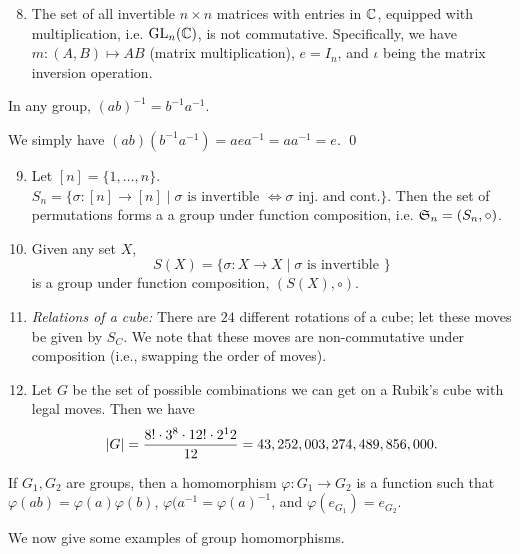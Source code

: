 \begin{enumerate}[label=(\alph*)]
    \setcounter{enumi}{7}
    \item The set of all invertible $n \times n$ matrices with entries in $\mathbb C$, equipped with multiplication, i.e. $\operatorname{GL}_n(\mathbb C)$, is not commutative. Specifically, we have $m : (A, B) \mapsto AB$ (matrix multiplication), $e = I_n$, and $\iota$ being the matrix inversion operation.
\end{enumerate}
\begin{simpleclaim}
    In any group, $(ab)^{-1} = b^{-1}a^{-1}$.
\end{simpleclaim}
\noindent We simply have $(ab)(b^{-1}a^{-1}) = a e a^{-1} = a a^{-1} = e$. \qed
\begin{enumerate}[label=(\alph*)]
    \setcounter{enumi}{8}
    \item Let $[n] = \{1, \dots, n\}$. $S_n = \{\sigma : [n] \to [n] \mid \sigma \text{ is invertible } \iff \sigma \text{ inj. and cont.} \}$. Then the set of permutations forms a a group under function composition, i.e. $\mathfrak S_n = (S_n, \circ)$.
    \item Given any set $X$,
    \[ S(X) = \{\sigma : X \to X \mid \sigma \text{ is invertible } \} \]
    is a group under function composition, $(S(X), \circ)$.
    \item \textit{Relations of a cube:} There are $24$ different rotations of a cube; let these moves be given by $S_C$. We note that these moves are non-commutative under composition (i.e., swapping the order of moves).
    \item Let $G$ be the set of possible combinations we can get on a Rubik's cube with legal moves. Then we have
    \[ \left\lvert G \right\rvert = \frac{8! \cdot 3^8 \cdot 12! \cdot 2^12}{12} = 43,252,003,274,489,856,000. \]
\end{enumerate}
\begin{definition}
    If $G_1, G_2$ are groups, then a homomorphism $\varphi : G_1 \to G_2$ is a function such that $\varphi(ab) = \varphi(a) \varphi(b)$, $\varphi(a^{-1} = \varphi(a)^{-1}$, and $\varphi(e_{G_1}) = e_{G_2}$.
\end{definition}
We now give some examples of group homomorphisms.
